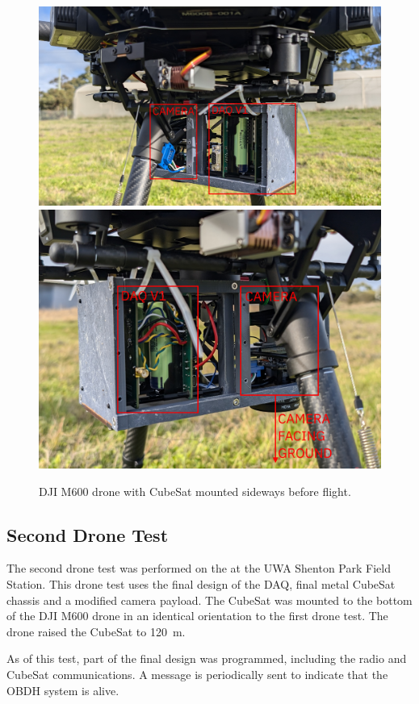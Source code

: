 \documentclass{report}
\begin{document}
\begin{figure}[H]
  \centering
  \includegraphics[width=0.9\linewidth]{images/1st_flight_drone_cube.jpg}
  \includegraphics[width=0.9\linewidth]{images/1st_flight_drone_cube_2.jpg}
  \caption{DJI M600 drone with CubeSat mounted sideways before flight.}
  \label{fig:drone-cube-1}
\end{figure}

\subsection{Second Drone Test}
The second drone test was performed on the  at the UWA Shenton Park Field Station. This drone test uses the final design of the DAQ, final metal CubeSat chassis and a modified camera payload. The CubeSat was mounted to the bottom of the DJI M600 drone in an identical orientation to the first drone test. The drone raised the CubeSat to \SI{120}{\metre}.

As of this test, part of the  final design was programmed, including the radio and CubeSat communications. A message is periodically sent to indicate that the OBDH system is alive.
\end{document}

